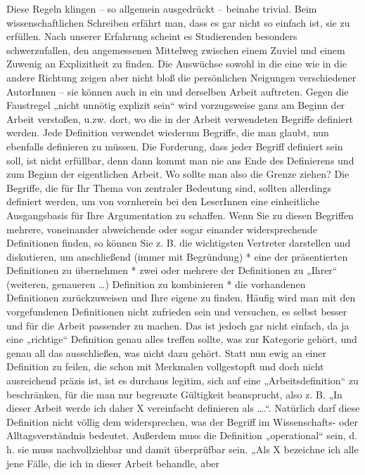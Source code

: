\documentclass[]{book}
\theoremstyle{definition}
\theoremstyle{definition}
\theoremstyle{definition}
\theoremstyle{remark}
\begin{document}
Diese Regeln klingen -- so allgemein ausgedrückt -- beinahe trivial.
Beim wissenschaftlichen Schreiben erfährt man, dass es gar nicht so
einfach ist, sie zu erfüllen. Nach unserer Erfahrung scheint es
Studierenden besonders schwerzufallen, den angemessenen Mittelweg
zwischen einem Zuviel und einem Zuwenig an Explizitheit zu finden. Die
Auswüchse sowohl in die eine wie in die andere Richtung zeigen aber
nicht bloß die persönlichen Neigungen verschiedener AutorInnen -- sie
können auch in ein und derselben Arbeit auftreten. Gegen die Faustregel
„nicht unnötig explizit sein`` wird vorzugsweise ganz am Beginn der
Arbeit verstoßen, u.zw. dort, wo die in der Arbeit verwendeten Begriffe
definiert werden. Jede Definition verwendet wiederum Begriffe, die man
glaubt, nun ebenfalls definieren zu müssen. Die Forderung, dass jeder
Begriff definiert sein soll, ist nicht erfüllbar, denn dann kommt man
nie ans Ende des Definierens und zum Beginn der eigentlichen Arbeit. Wo
sollte man also die Grenze ziehen? Die Begriffe, die für Ihr Thema von
zentraler Bedeutung sind, sollten allerdings definiert werden, um von
vornherein bei den LeserInnen eine einheitliche Ausgangsbasis für Ihre
Argumentation zu schaffen. Wenn Sie zu diesen Begriffen mehrere,
voneinander abweichende oder sogar einander widersprechende Definitionen
finden, so können Sie z. B. die wichtigsten Vertreter darstellen und
diskutieren, um anschließend (immer mit Begründung) * eine der
präsentierten Definitionen zu übernehmen * zwei oder mehrere der
Definitionen zu „Ihrer`` (weiteren, genaueren \ldots{}) Definition zu
kombinieren * die vorhandenen Definitionen zurückzuweisen und Ihre
eigene zu finden. Häufig wird man mit den vorgefundenen Definitionen
nicht zufrieden sein und versuchen, es selbst besser und für die Arbeit
passender zu machen. Das ist jedoch gar nicht einfach, da ja eine
„richtige`` Definition genau alles treffen sollte, was zur Kategorie
gehört, und genau all das ausschließen, was nicht dazu gehört. Statt nun
ewig an einer Definition zu feilen, die schon mit Merkmalen vollgestopft
und doch nicht ausreichend präzis ist, ist es durchaus legitim, sich auf
eine „Arbeitsdefinition`` zu beschränken, für die man nur begrenzte
Gültigkeit beansprucht, also z. B. „In dieser Arbeit werde ich daher X
vereinfacht definieren als \ldots{}.``. Natürlich darf diese Definition
nicht völlig dem widersprechen, was der Begriff im Wissenschafts- oder
Alltagsverständnis bedeutet. Außerdem muss die Definition „operational``
sein, d. h. sie muss nachvollziehbar und damit überprüfbar sein. „Als X
bezeichne ich alle jene Fälle, die ich in dieser Arbeit behandle, aber
\end{document}
